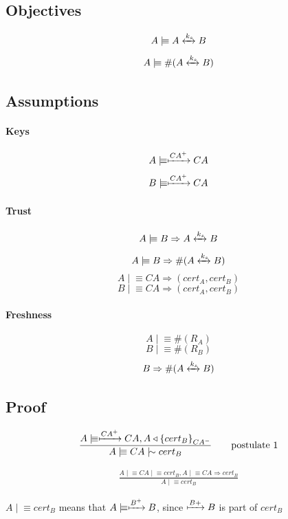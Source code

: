 \documentclass[a4paper,12pt]{article}
\newcommand{\believes}{\mid\!\equiv}
\newcommand{\sees}{\triangleleft}
\newcommand{\oncesaid}{\mid\!\sim}
\newcommand{\controls}{\Rightarrow}
\newcommand{\fresh}[1]{\#(#1)}
\newcommand{\encrypt}[2]{{ \{ #1 \} }_{#2}}
\newcommand{\sharekey}[1]{\xleftrightarrow{#1}}
\newcommand{\pubkey}[1]{\xmapsto{#1}}
\begin{document}
\subsection{Objectives}

\[A \believes A \sharekey{k_s} B \]
\[A \believes \fresh{A \sharekey{k_s} B} \]

\subsection{Assumptions}

\paragraph{Keys}

\[A \believes \pubkey{CA^+} CA \]
\[B \believes \pubkey{CA^+} CA \]

\paragraph{Trust}

\[A \believes B \controls A \sharekey{k_s} B \]
\[A \believes B \controls \fresh{A \sharekey{k_s} B} \]
\[A \believes CA \controls (cert_A, cert_B) \]
\[B \believes CA \controls (cert_A, cert_B) \]

\paragraph{Freshness}

\[A \believes \fresh{R_A} \]
\[B \believes \fresh{R_B} \]
\[B \controls \fresh{A \sharekey{k_s} B} \]

\subsection{Proof}

\begin{align}
\frac{A \believes \pubkey{CA^+} CA, A \sees \encrypt{cert_B}{CA^-}}{A \believes CA \oncesaid cert_B} \tag*{postulate 1}
\end{align}

\begin{align}
\frac{A \believes CA \believes cert_B, A \believes CA \controls cert_B}{A \believes cert_B} \tag*{postulate 3}
\end{align}

$A \believes cert_B$ means that $A \believes \pubkey{B^+} B$, since $\pubkey{B+} B$ is part of $cert_B$
\end{document}
